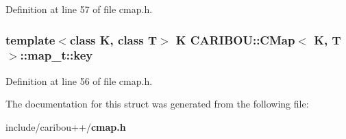 Definition at line 57 of file cmap.\+h.

\subsubsection[{key}]{\setlength{\rightskip}{0pt plus 5cm}template$<$class K, class T$>$ K {\bf C\+A\+R\+I\+B\+O\+U\+::\+C\+Map}$<$ K, T $>$\+::map\+\_\+t\+::key}\label{struct_c_a_r_i_b_o_u_1_1_c_map_1_1map__t_a2ec161b705da8b38bfcd59469250668d}


Definition at line 56 of file cmap.\+h.



The documentation for this struct was generated from the following file\+:\begin{DoxyCompactItemize}
\item 
include/caribou++/{\bf cmap.\+h}\end{DoxyCompactItemize}
